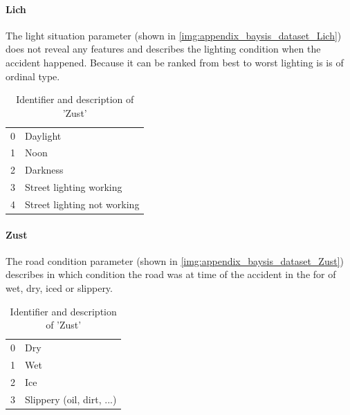 \documentclass[a4paper,headsepline,footsepline,fontsize=11pt,BCOR=12mm,DIV=12]{report}
\begin{document}
\paragraph{Lich}
The light situation parameter (shown in \ref{img:appendix_baysis_dataset_Lich}) does not reveal any features and describes the lighting condition when the accident happened. Because it can be ranked from best to worst lighting is is of ordinal type.
\noindent
\begin{table}[h!]
	\centering
	\begin{tabular}{c|l}  
	0 & Daylight \\
    1 & Noon \\
    2 & Darkness \\
    3 & Street lighting working \\
    4 & Street lighting not working \\
	\end{tabular}
	\caption{Identifier and description of 'Zust'}
	\label{table:baysis_dataset_Zust}
\end{table}

\paragraph{Zust}
The road condition parameter (shown in \ref{img:appendix_baysis_dataset_Zust}) describes in which condition the road was at time of the accident in the for of wet, dry, iced or slippery.
\noindent
\begin{table}[h!]
	\centering
	\begin{tabular}{c|l}  
		0 & Dry \\ 
 		1 & Wet \\ 
 		2 & Ice \\
 		3 & Slippery (oil, dirt, ...)  \\
	\end{tabular}
	\caption{Identifier and description of 'Zust'}
	\label{table:baysis_dataset_Zust}
\end{table}
\end{document}
